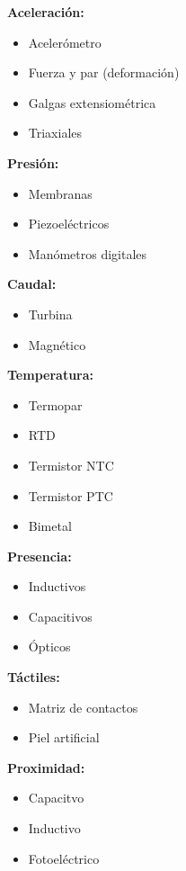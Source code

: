 \textbf{Aceleración:}
\begin{itemize}
  \item     Acelerómetro
  \item     Fuerza y par (deformación)
  \item     Galgas extensiométrica
  \item     Triaxiales
\end{itemize}

\textbf{Presión:}
\begin{itemize}
  \item     Membranas
  \item     Piezoeléctricos
  \item     Manómetros digitales
\end{itemize}

\textbf{Caudal:}
\begin{itemize}
  \item     Turbina
  \item     Magnético
\end{itemize}

\textbf{Temperatura:}
\begin{itemize}
  \item     Termopar
  \item     RTD
  \item     Termistor NTC
  \item     Termistor PTC
  \item     Bimetal
\end{itemize}

\textbf{Presencia:}
\begin{itemize}
  \item     Inductivos
  \item     Capacitivos
  \item     Ópticos
\end{itemize}

\textbf{Táctiles:}
\begin{itemize}
  \item     Matriz de contactos
  \item     Piel artificial
\end{itemize}

\textbf{Proximidad:}
\begin{itemize}
  \item     Capacitvo
  \item     Inductivo
  \item     Fotoeléctrico
\end{itemize}

